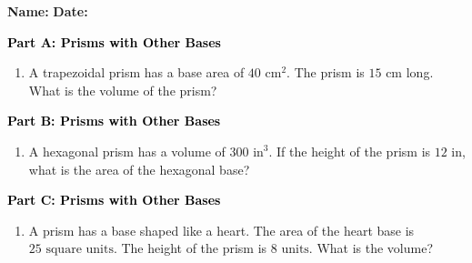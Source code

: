 \documentclass[12pt, letterpaper, fleqn]{article}
\begin{document}
\textbf{Name:} \underline{\hspace{5cm}}
\hfill
\textbf{Date:} \underline{\hspace{3cm}}\\

\begin{tcolorbox}[colback=customteal!20]
\large\textcolor{black}{\textbf{Part A: Prisms with Other Bases}}
\end{tcolorbox}

\vspace{3mm}

\begin{enumerate}[itemsep=4.2cm, leftmargin=0.6cm]
\item A trapezoidal prism has a base area of $40\text{ cm}^2$. The prism is $15\text{ cm}$ long. What is the volume of the prism?
\end{enumerate}

\newpage

\begin{tcolorbox}[colback=customteal!20]
\large\textcolor{black}{\textbf{Part B: Prisms with Other Bases}}
\end{tcolorbox}

\vspace{3mm}

\begin{enumerate}[itemsep=4.2cm, leftmargin=0.6cm, resume]
\item A hexagonal prism has a volume of $300\text{ in}^3$. If the height of the prism is $12\text{ in}$, what is the area of the hexagonal base?
\end{enumerate}

\newpage

\begin{tcolorbox}[colback=customteal!20]
\large\textcolor{black}{\textbf{Part C: Prisms with Other Bases}}
\end{tcolorbox}

\vspace{3mm}

\begin{enumerate}[itemsep=4.2cm, leftmargin=0.6cm, resume]
\item A prism has a base shaped like a heart. The area of the heart base is $25\text{ square units}$. The height of the prism is $8\text{ units}$. What is the volume?
\end{enumerate}
\end{document}
